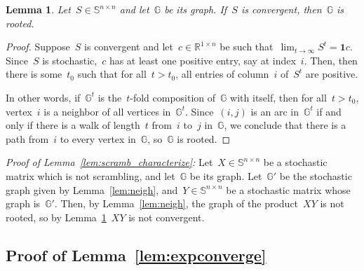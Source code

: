 \documentclass[letterpaper, 10 pt, conference]{ieeeconf}  %
\newtheorem{lemma}{Lemma}
\newcommand{\R}{\mathbb R}
\newcommand{\stoc}{\mathbb{S}} %
\begin{document}
\begin{lemma}\label{lem:convergent_is_rooted}
    Let~$S \in \stoc^{n \times n}$ and let~$\mathbb{G}$ be its graph. If~$S$ is convergent, then~$\mathbb{G}$ is rooted. 
\end{lemma}
\begin{proof}
    Suppose~$S$ is convergent and let~$c \in \R^{1 \times n}$ be such that~$\lim_{t \to \infty} S^t = \mathbf{1}c$. Since~$S$ is stochastic,~$c$ has at least one positive entry, say at index~$i$. Then, then there is some~$t_0$ such that for all~$t > t_0$, all entries of column~$i$ of~$S^t$ are positive.
    
    In other words, if~$\mathbb{G}^t$ is the~$t$-fold composition of~$\mathbb{G}$ with itself, then for all~$t > t_0$, vertex~$i$ is a neighbor of all vertices in~$\mathbb{G}^t$. Since~$(i,j)$ is an arc in~$\mathbb{G}^t$ if and only if there is a walk of length~$t$ from~$i$ to~$j$ in~$\mathbb{G}$, we conclude that there is a path from~$i$ to every vertex in~$\mathbb{G}$, so~$\mathbb{G}$ is rooted.
\end{proof}

\vspace{1em}

\textit{Proof of Lemma~\ref{lem:scramb_characterize}:}
    Let~$X \in \stoc^{n \times n}$ be a stochastic matrix which is not scrambling, and let~$\mathbb{G}$ be its graph. Let~$\mathbb{G}'$ be the stochastic graph given by Lemma~\ref{lem:neigh}, and~$Y \in \stoc^{n \times n}$ be a stochastic matrix whose graph is~$\mathbb{G}'$. Then, by Lemma~\ref{lem:neigh}, the graph of the product~$XY$ is not rooted, so by Lemma~\ref{lem:convergent_is_rooted}~$XY$ is not convergent.
    \hspace*{\fill}~\QED


\subsection{Proof of Lemma~\ref{lem:expconverge}}
\end{document}
